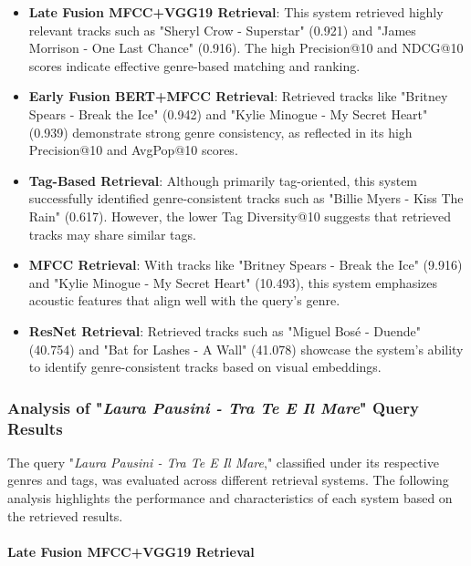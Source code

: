 \documentclass[sigconf]{acmart}
\begin{document}
\begin{itemize}
    \item \textbf{Late Fusion MFCC+VGG19 Retrieval}: This system retrieved highly relevant tracks such as "Sheryl Crow - Superstar" (0.921) and "James Morrison - One Last Chance" (0.916). The high Precision@10 and NDCG@10 scores indicate effective genre-based matching and ranking.
    
    \item \textbf{Early Fusion BERT+MFCC Retrieval}: Retrieved tracks like "Britney Spears - Break the Ice" (0.942) and "Kylie Minogue - My Secret Heart" (0.939) demonstrate strong genre consistency, as reflected in its high Precision@10 and AvgPop@10 scores.
    
    \item \textbf{Tag-Based Retrieval}: Although primarily tag-oriented, this system successfully identified genre-consistent tracks such as "Billie Myers - Kiss The Rain" (0.617). However, the lower Tag Diversity@10 suggests that retrieved tracks may share similar tags.
    
    \item \textbf{MFCC Retrieval}: With tracks like "Britney Spears - Break the Ice" (9.916) and "Kylie Minogue - My Secret Heart" (10.493), this system emphasizes acoustic features that align well with the query's genre.
    
    \item \textbf{ResNet Retrieval}: Retrieved tracks such as "Miguel Bosé - Duende" (40.754) and "Bat for Lashes - A Wall" (41.078) showcase the system's ability to identify genre-consistent tracks based on visual embeddings.
\end{itemize}

\subsubsection{Analysis of "\textit{Laura Pausini - Tra Te E Il Mare}" Query Results}
\label{subsubsec:analysis_query_results}

The query "\textit{Laura Pausini - Tra Te E Il Mare}," classified under its respective genres and tags, was evaluated across different retrieval systems. The following analysis highlights the performance and characteristics of each system based on the retrieved results.

\paragraph{Late Fusion MFCC+VGG19 Retrieval}
\end{document}
